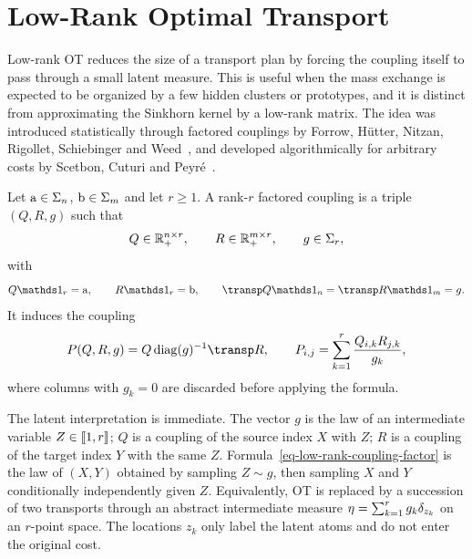 \section{Low-Rank Optimal Transport}
\label{sec-low-rank-ot}

Low-rank OT reduces the size of a transport plan by forcing the coupling itself to pass through a small latent measure. This is useful when the mass exchange is expected to be organized by a few hidden clusters or prototypes, and it is distinct from approximating the Sinkhorn kernel by a low-rank matrix. The idea was introduced statistically through factored couplings by Forrow, H\"utter, Nitzan, Rigollet, Schiebinger and Weed~\cite{forrow2019factored}, and developed algorithmically for arbitrary costs by Scetbon, Cuturi and Peyr\'e~\cite{scetbon2021lowrank}.

\begin{defn}\label{def-low-rank-couplings}
	Let $\mathrm{a}\in\Sigma_n$, $\mathrm{b}\in\Sigma_m$ and let $r\geq1$. A rank-$r$ factored coupling is a triple $(Q,R,g)$ such that
	\[
		Q\in\mathbb{R}_+^{n\times r},\qquad
		R\in\mathbb{R}_+^{m\times r},
		\qquad g\in\Sigma_r,
	\]
	with
	\[
		Q\ones_r=\a,
		\qquad
		R\ones_r=\b,
		\qquad
		\transp Q\ones_n=\transp R\ones_m=g.
	\]
	It induces the coupling
	\begin{equation}\label{eq-low-rank-coupling-factor}
		P(Q,R,g)
		=
		Q\diag(g)^{-1}\transp R,
		\qquad
		P_{i,j}=\sum_{k=1}^r \frac{Q_{i,k}R_{j,k}}{g_k},
	\end{equation}
	where columns with $g_k=0$ are discarded before applying the formula.
\end{defn}

The latent interpretation is immediate. The vector $g$ is the law of an intermediate variable $Z\in\llbracket1,r\rrbracket$; $Q$ is a coupling of the source index $X$ with $Z$; $R$ is a coupling of the target index $Y$ with the same $Z$. Formula~\eqref{eq-low-rank-coupling-factor} is the law of $(X,Y)$ obtained by sampling $Z\sim g$, then sampling $X$ and $Y$ conditionally independently given $Z$. Equivalently, OT is replaced by a succession of two transports through an abstract intermediate measure $\eta=\sum_{k=1}^r g_k\delta_{z_k}$ on an $r$-point space. The locations $z_k$ only label the latent atoms and do not enter the original cost.

